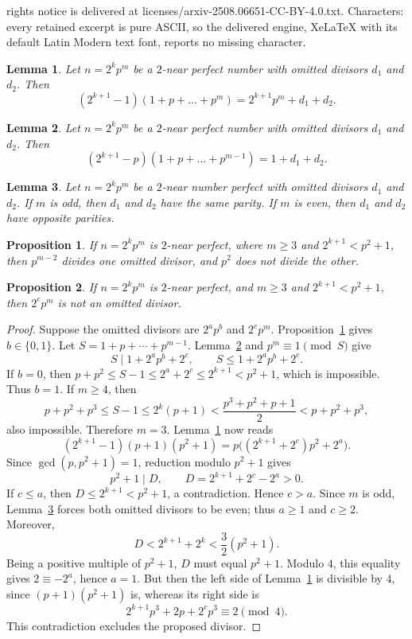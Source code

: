 \documentclass[10pt,a4paper]{amsart}
\newtheorem{lemma}{Lemma}
\newtheorem{proposition}{Proposition}
\begin{document}
rights notice is delivered at licenses/arxiv-2508.06651-CC-BY-4.0.txt. Characters: every retained excerpt is pure ASCII, so the delivered engine, XeLaTeX with its default Latin Modern text font, reports no missing character.
\begin{lemma}\label{lem:basic_equation}
    Let $n=2^kp^m$ be a $2$-near perfect number with omitted divisors $d_1$ and $d_2$. Then
    \[(2^{k+1}-1)(1+p+\ldots+p^m)=2^{k+1}p^m+d_1+d_2.\]
\end{lemma}

\begin{lemma}\label{lem:equivalent_form}
    Let $n=2^kp^m$ be a $2$-near perfect number with omitted divisors $d_1$ and $d_2$. Then 
    \[(2^{k+1}-p)(1+p+\ldots+p^{m-1})=1+d_1+d_2.\]
\end{lemma}

\begin{lemma}\label{lem:parity_constraint}
    Let $n=2^kp^m$ be a $2$-near number perfect with omitted divisors $d_1$ and $d_2$. If $m$ is odd, then $d_1$ and $d_2$ have the same parity. If $m$ is even, then $d_1$ and $d_2$ have opposite parities.
\end{lemma}

\begin{proposition}\label{prop:p_divisibility_constraint}
   If $n=2^kp^m$ is $2$-near perfect, where $m\ge3$ and $2^{k+1}<p^2+1$, then $p^{m-2}$ divides one omitted divisor, and $p^2$ does not divide the other. 
\end{proposition}

\begin{proposition}\label{prop:no_pm_divisor}
    If $n=2^kp^m$ is $2$-near perfect, and $m\ge3$ and $2^{k+1}<p^2+1$, then $2^cp^m$ is not an omitted divisor.
\end{proposition}

\begin{proof}
Suppose the omitted divisors are $2^ap^b$ and $2^cp^m$.
Proposition~\ref{prop:p_divisibility_constraint} gives $b\in\{0,1\}$.
Let $S=1+p+\cdots+p^{m-1}$. Lemma~\ref{lem:equivalent_form}
and $p^m\equiv1\pmod S$ give
\[
S\mid1+2^ap^b+2^c,
\qquad S\le1+2^ap^b+2^c.
\]
If $b=0$, then $p+p^2\le S-1\le2^a+2^c\le2^{k+1}<p^2+1$,
which is impossible. Thus $b=1$.
If $m\ge4$, then
\[
p+p^2+p^3\le S-1\le2^k(p+1)
<\frac{p^3+p^2+p+1}{2}<p+p^2+p^3,
\]
also impossible. Therefore $m=3$. Lemma~\ref{lem:basic_equation} now reads
\[
(2^{k+1}-1)(p+1)(p^2+1)
=p\bigl((2^{k+1}+2^c)p^2+2^a\bigr).
\]
Since $\gcd(p,p^2+1)=1$, reduction modulo $p^2+1$ gives
\[
p^2+1\mid D,\qquad D=2^{k+1}+2^c-2^a>0.
\]
If $c\le a$, then $D\le2^{k+1}<p^2+1$, a contradiction.
Hence $c>a$. Since $m$ is odd, Lemma~\ref{lem:parity_constraint}
forces both omitted divisors to be even; thus $a\ge1$ and $c\ge2$.
Moreover,
\[
D<2^{k+1}+2^k<\frac32(p^2+1).
\]
Being a positive multiple of $p^2+1$, $D$ must equal $p^2+1$.
Modulo $4$, this equality gives $2\equiv-2^a$, hence $a=1$.
But then the left side of Lemma~\ref{lem:basic_equation} is divisible
by $4$, since $(p+1)(p^2+1)$ is, whereas its right side is
\[
2^{k+1}p^3+2p+2^cp^3\equiv2\pmod4.
\]
This contradiction excludes the proposed divisor.
\end{proof}
\end{document}
